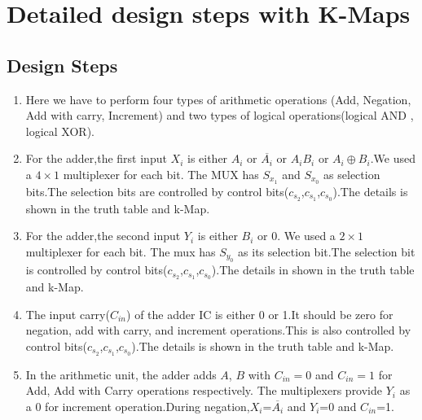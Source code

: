 \documentclass{article}
\begin{document}
\newpage














\section{Detailed design steps with K-Maps}
\subsection{Design Steps}
\begin{enumerate}
  
    

    \item Here we have to perform four types of arithmetic operations (Add, Negation, Add with carry, Increment) and two types of logical operations(logical AND , logical XOR).

    \item For the adder,the first input $X_i$ is either $A_i$ or $\overline{A_i}$ or $A_i B_i$  or $A_i \oplus B_i$.We used a $4 \times 1$    multiplexer  for  each  bit.
     The MUX has  $S_{x_1}$ and $S_{x_0}$ as selection bits.The selection bits are controlled by control bits($c_{s_2}$,$c_{s_1}$,$c_{s_0}$).The details is shown in the truth table and k-Map.

     \item For the adder,the second input $Y_i$ is either $B_i$ or 0. We used a $2 \times 1$ multiplexer for each bit. 
     The mux has $S_{y_0}$ as its selection bit.The selection bit is controlled by control bits($c_{s_2}$,$c_{s_1}$,$c_{s_0}$).The details in shown in the truth table and k-Map.

    \item The input carry($C_{in}$) of the adder IC is either 0 or 1.It should be zero for negation, add with carry, and increment operations.This is also controlled by control bits($c_{s_2}$,$c_{s_1}$,$c_{s_0}$).The details is shown in the truth table and k-Map.

    \item In the arithmetic unit, the adder adds $A$, $B$ with $C_{in}=0$ and $C_{in}=1$ for Add, Add with Carry operations respectively. The multiplexers provide $Y_i$ as a 0 for increment operation.During negation,$X_i$=$\overline{A_i}$ and $Y_i$=0 and $C_{in}$=1. 
    

\end{enumerate}
\end{document}
